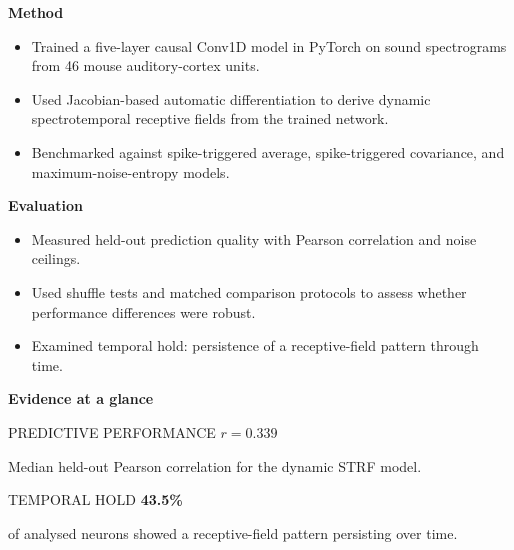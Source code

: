 \documentclass[10pt,a4paper]{article}
\begin{document}
\begin{minipage}[t]{0.485\linewidth}
\textbf{Method}\par\vspace{3pt}
\begin{itemize}
\item Trained a five-layer causal Conv1D model in PyTorch on sound spectrograms from 46 mouse auditory-cortex units.
\item Used Jacobian-based automatic differentiation to derive dynamic spectrotemporal receptive fields from the trained network.
\item Benchmarked against spike-triggered average, spike-triggered covariance, and maximum-noise-entropy models.
\end{itemize}
\end{minipage}\hfill
\begin{minipage}[t]{0.485\linewidth}
\textbf{Evaluation}\par\vspace{3pt}
\begin{itemize}
\item Measured held-out prediction quality with Pearson correlation and noise ceilings.
\item Used shuffle tests and matched comparison protocols to assess whether performance differences were robust.
\item Examined temporal hold: persistence of a receptive-field pattern through time.
\end{itemize}
\end{minipage}
\vspace{10pt}

\textbf{Evidence at a glance}\par\vspace{5pt}
\begin{minipage}[t]{0.485\linewidth}
\begin{metricbox}{PREDICTIVE PERFORMANCE}
{\Large\bfseries\color{navy} $r = 0.339$}\par\vspace{2pt}
Median held-out Pearson correlation for the dynamic STRF model.
\end{metricbox}
\end{minipage}\hfill
\begin{minipage}[t]{0.485\linewidth}
\begin{metricbox}{TEMPORAL HOLD}
{\Large\bfseries\color{navy} 43.5\%}\par\vspace{2pt}
of analysed neurons showed a receptive-field pattern persisting over time.
\end{metricbox}
\end{minipage}
\vspace{10pt}
\end{document}

